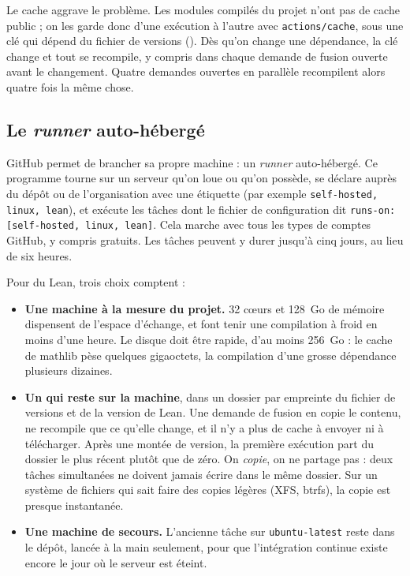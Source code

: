Le cache aggrave le problème. Les modules compilés du projet n'ont pas de cache public ; on
les garde donc d'une exécution à l'autre avec \texttt{actions/cache}, sous une clé qui dépend
du fichier de versions (). Dès qu'on change une dépendance, la clé
change et tout se recompile, y compris dans chaque demande de fusion ouverte avant le
changement. Quatre demandes ouvertes en parallèle recompilent alors quatre fois la même
chose.

\subsection*{Le \emph{runner} auto-hébergé}

GitHub permet de brancher sa propre machine : un \emph{runner} auto-hébergé. Ce programme
tourne sur un serveur qu'on loue ou qu'on possède, se déclare auprès du dépôt ou de
l'organisation avec une étiquette (par exemple \texttt{self-hosted, linux, lean}), et
exécute les tâches dont le fichier de configuration dit \texttt{runs-on: [self-hosted,
linux, lean]}. Cela marche avec tous les types de comptes GitHub, y compris gratuits. Les
tâches peuvent y durer jusqu'à cinq jours, au lieu de six heures.

Pour du Lean, trois choix comptent :
\begin{itemize}
  \item \textbf{Une machine à la mesure du projet.} 32 cœurs et 128~Go de mémoire dispensent de
        l'espace d'échange, et font tenir une compilation à froid en moins d'une heure.
        Le disque doit être rapide, d'au moins 256~Go : le cache de mathlib pèse quelques
        gigaoctets, la compilation d'une grosse dépendance plusieurs dizaines.
  \item \textbf{Un  qui reste sur la machine}, dans un dossier par empreinte du
        fichier de versions et de la version de Lean. Une demande de fusion en copie le
        contenu, ne recompile que ce qu'elle change, et il n'y a plus de cache à envoyer ni
        à télécharger. Après une montée de version, la première exécution part du dossier le
        plus récent plutôt que de zéro. On \emph{copie}, on ne partage pas : deux tâches
        simultanées ne doivent jamais écrire dans le même dossier. Sur un système de fichiers
        qui sait faire des copies légères (XFS, btrfs), la copie est presque instantanée.
  \item \textbf{Une machine de secours.} L'ancienne tâche sur \texttt{ubuntu-latest} reste dans
        le dépôt, lancée à la main seulement, pour que l'intégration continue existe encore le
        jour où le serveur est éteint.
\end{itemize}

